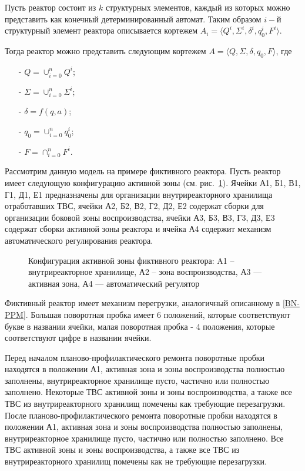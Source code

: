 Пусть реактор состоит из $k$ структурных элементов, каждый из которых можно представить как конечный детерминированный автомат.
Таким образом $i-$й структурный элемент реактора описывается кортежем $A_i = \langle Q^i, \Sigma^i, \delta^i, q_0^i, F^i  \rangle$. 

Тогда реактор можно представить следующим кортежем $A = \langle Q, \Sigma, \delta, q_0, F  \rangle$, где
\begin{itemize}
 \item [-] $Q = \cup_{i=0}^n Q^i$;
 \item [-] $\Sigma = \cup_{i=0}^n \Sigma^i$;
 \item [-] $\delta = f (q, a)$;
 \item [-] $q_0 = \cup_{i=0}^n q_0^i$;
 \item [-] $F = \cap_{i=0}^n F^i$.
\end{itemize}

Рассмотрим данную модель на примере фиктивного реактора.
Пусть реактор имеет следующую конфигурацию активной зоны (см. рис.~\ref{pic:fict-grid}).
Ячейки А1, Б1, В1, Г1, Д1, Е1 предназначены для организации внутриреакторного хранилища отработавших ТВС, 
ячейки А2, Б2, В2, Г2, Д2, Е2 содержат сборки для организации боковой зоны воспроизводства, ячейки А3, Б3, В3, Г3, Д3, Е3 содержат сборки активной зоны реактора и ячейка А4 содержит механизм автоматического регулирования реактора.
\begin{figure}[ht]
\caption[Конфигурация активной зоны фиктивного реактора]{Конфигурация активной зоны фиктивного реактора: A1 -- внутриреакторное хранилище, А2 -- зона воспроизводства, А3 --- активная зона, А4 --- автоматический регулятор}
\label{pic:fict-grid}
\end{figure}

Фиктивный реактор имеет механизм перегрузки, аналогичный описанному в \ref{BN-PPM}.
Большая поворотная пробка имеет 6 положений, которые соответствуют букве в названии ячейки, малая поворотная пробка - 4 положения, которые соответствуют цифре в названии ячейки.

Перед началом планово-профилактического ремонта поворотные пробки находятся в положении А1, активная зона и зоны воспроизводства  полностью заполнены, внутриреакторное хранилище пусто, частично или полностью заполнено.
Некоторые ТВС активной зоны и зоны воспроизводства, а также все ТВС из внутриреакторного хранилищ помечены как требующие перезагрузки. 
После планово-профилактического ремонта поворотные пробки находятся в положении А1, активная зона и зоны воспроизводства  полностью заполнены, внутриреакторное хранилище пусто, частично или полностью заполнено.
Все ТВС активной зоны и зоны воспроизводства, а также все ТВС из внутриреакторного хранилищ помечены как не требующие перезагрузки. 

